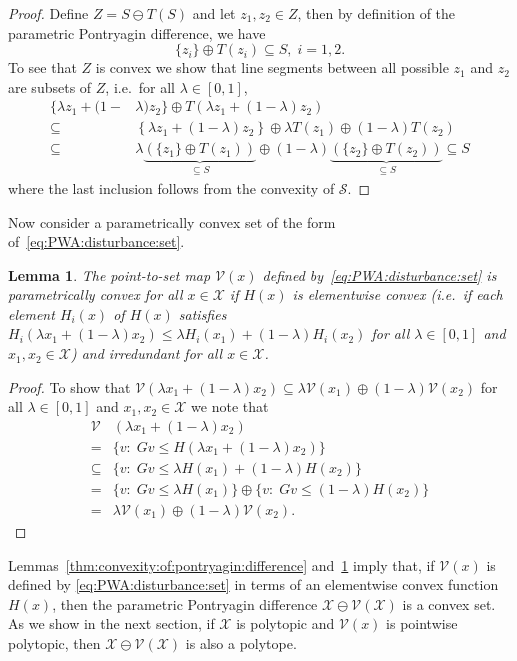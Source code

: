 \documentclass[letterpaper, 10pt, conference]{ieeeconf} %
\newtheorem{thm}{Lemma}[section]
\begin{document}
%
\begin{proof}
Define $ Z =  S\ominus T( S)$ and let $z_1,z_2\in Z$, then
by definition of the parametric Pontryagin difference, we have
%
\[
        \{z_i\} \oplus T(z_i) \subseteq S,\; i=1,2.
\]
%
To see that $ Z$ is convex we show that line segments between
all possible $z_1$ and $z_2$ are subsets of $ Z$, i.e.~for all $\lambda \in [0,1]$,
\[\begin{aligned}
  \{ \lambda z_1 + (1-&\lambda)z_2
  \}\oplus T\left( \lambda z_1 + (1-\lambda)z_2\right)\\
  \subseteq&\left\{ \lambda z_1 + (1-\lambda)z_2
  \right\}\oplus \lambda T(z_1) \oplus (1-\lambda)
  T(z_2)\\
  \subseteq &\lambda\underbrace{(\{z_1\}\oplus T(z_1))}_{\subseteq S}\oplus
  (1-\lambda)\underbrace{(\{z_2\}\oplus T(z_2))}_{\subseteq S}
  \subseteq S
\end{aligned}\]
%
where the last inclusion follows from the convexity of $\mathcal S$.
\end{proof}
%
%
Now consider a parametrically convex set of the form of~\eqref{eq:PWA:disturbance:set}.
\begin{thm}\label{thm:convex:parametric:set}
  The point-to-set map $\mathcal V (x)$ defined by~\eqref{eq:PWA:disturbance:set} is parametrically 
  convex for all $x\in \mathcal X$ if $H(x)$ is elementwise convex (i.e.~if each element $H_i(x)$ of $H(x)$ satisfies $H_i(\lambda x_1+(1-\lambda)x_2)\leq 
  \lambda H_i(x_1)+(1-\lambda)H_i(x_2)$ for all    $\lambda\in[0,1]$ and $x_1, x_2\in\mathcal X$) and
  irredundant for all $x\in \mathcal X$.
\end{thm}
%
\begin{proof}
To show that $\mathcal V(\lambda x_1 + (1-\lambda)x_2)\subseteq \lambda\mathcal V(x_1) \oplus(1-\lambda)
\mathcal V(x_2)$ for all $\lambda \in [0,1]$ and $x_1, x_2\in\mathcal X$ we note that
%
\begin{align*}
  \mathcal V&(\lambda x_1 + (1-\lambda)x_2)\\
  =& \{v:\; G v \leq H(\lambda x_1 + (1-\lambda)x_2)\}\\
  \subseteq& \{v:\;Gv\leq\lambda H(x_1)+(1-\lambda) H(x_2)\}\\
  =&\{v:\;Gv\leq\lambda H(x_1)\}\oplus\{v
  :\;Gv\leq(1-\lambda)H(x_2)\}\\
  =&\lambda\mathcal V(x_1)\oplus(1-\lambda)\mathcal V(x_2).
  \end{align*}
\baselineskip
\end{proof} 
%
%
\def\genmat{\Xi} \def\genvec{\xi}
Lemmas~\ref{thm:convexity:of:pontryagin:difference} and~\ref{thm:convex:parametric:set} imply that, 
if $\mathcal V(x)$ is defined by \eqref{eq:PWA:disturbance:set} in terms of an elementwise convex 
function $H(x)$, then the parametric Pontryagin difference $\mathcal X\ominus \mathcal V(\mathcal X)$
is a convex set.
As we show in the next section, if $\mathcal X$ is polytopic and $\mathcal 
V(x)$ is pointwise polytopic, then $\mathcal X\ominus\mathcal V(\mathcal X)$ is 
also a polytope. 
%
%
%
%
\end{document}
